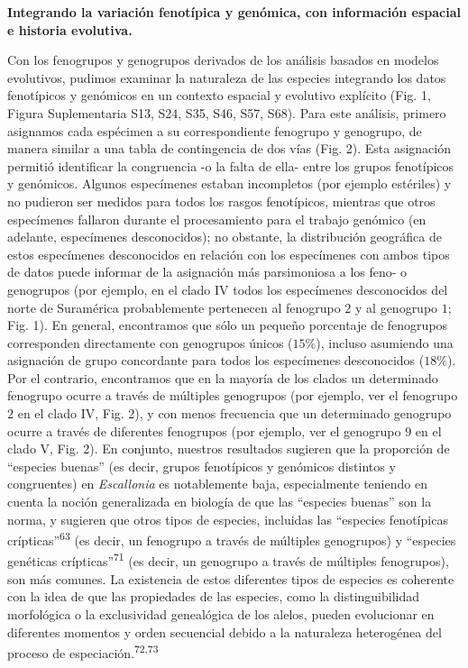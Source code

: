 \documentclass[
  11pt,
]{article}
\begin{document}
\textbf{Integrando la variación fenotípica y genómica, con información espacial e historia evolutiva.}

Con los fenogrupos y genogrupos derivados de los análisis basados en modelos evolutivos, pudimos examinar la naturaleza de las especies integrando los datos fenotípicos y genómicos en un contexto espacial y evolutivo explícito (Fig. 1, Figura Suplementaria S13, S24, S35, S46, S57, S68). Para este análisis, primero asignamos cada espécimen a su correspondiente fenogrupo y genogrupo, de manera similar a una tabla de contingencia de dos vías (Fig. 2). Esta asignación permitió identificar la congruencia -o la falta de ella- entre los grupos fenotípicos y genómicos. Algunos especímenes estaban incompletos (por ejemplo estériles) y no pudieron ser medidos para todos los rasgos fenotípicos, mientras que otros especímenes fallaron durante el procesamiento para el trabajo genómico (en adelante, especímenes desconocidos); no obstante, la distribución geográfica de estos especímenes desconocidos en relación con los especímenes con ambos tipos de datos puede informar de la asignación más parsimoniosa a los feno- o genogrupos (por ejemplo, en el clado IV todos los especímenes desconocidos del norte de Suramérica probablemente pertenecen al fenogrupo \(2\) y al genogrupo \(1\); Fig. 1). En general, encontramos que sólo un pequeño porcentaje de fenogrupos corresponden directamente con genogrupos únicos (\(15\%\)), incluso asumiendo una asignación de grupo concordante para todos los especímenes desconocidos (\(18\%\)). Por el contrario, encontramos que en la mayoría de los clados un determinado fenogrupo ocurre a través de múltiples genogrupos (por ejemplo, ver el fenogrupo \(2\) en el clado IV, Fig. 2), y con menos frecuencia que un determinado genogrupo ocurre a través de diferentes fenogrupos (por ejemplo, ver el genogrupo \(9\) en el clado V, Fig. 2). En conjunto, nuestros resultados sugieren que la proporción de ``especies buenas'' (es decir, grupos fenotípicos y genómicos distintos y congruentes) en \emph{Escallonia} es notablemente baja, especialmente teniendo en cuenta la noción generalizada en biología de que las ``especies buenas'' son la norma, y sugieren que otros tipos de especies, incluidas las ``especies fenotípicas crípticas''\textsuperscript{63} (es decir, un fenogrupo a través de múltiples genogrupos) y ``especies genéticas crípticas''\textsuperscript{71} (es decir, un genogrupo a través de múltiples fenogrupos), son más comunes. La existencia de estos diferentes tipos de especies es coherente con la idea de que las propiedades de las especies, como la distinguibilidad morfológica o la exclusividad genealógica de los alelos, pueden evolucionar en diferentes momentos y orden secuencial debido a la naturaleza heterogénea del proceso de especiación.\textsuperscript{72,73}
\end{document}
